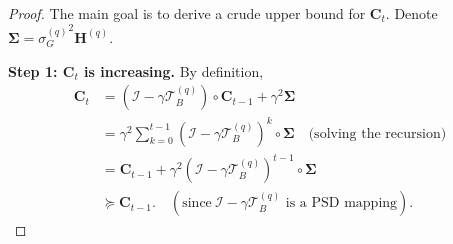 \documentclass[11pt, letterpaper]{article}
\begin{document}
\begin{proof}
    The main goal is to derive a crude upper bound for $\mathbf{C}_t$. Denote $\boldsymbol{\Sigma}={\sigma_G^{(q)}}^2\mathbf{H}^{(q)}$.
    
    \textbf{Step 1: $\mathbf{C}_t$ is increasing.} By definition,
    \begin{equation*}
        \begin{aligned}
            \mathbf{C}_{t} & =(\mathcal{I}-\gamma\mathcal{T}_B^{(q)})\circ\mathbf{C}_{t-1}+\gamma^{2}\boldsymbol{\Sigma} \\
            & =\gamma^2\sum_{k=0}^{t-1}(\mathcal{I}-\gamma\mathcal{T}_B^{(q)})^k\circ\boldsymbol{\Sigma}\quad\text{(solving the recursion)} \\
            & =\mathbf{C}_{t-1}+\gamma^{2}(\mathcal{I}-\gamma\mathcal{T}_B^{(q)})^{t-1}\circ\mathbf{\Sigma} \\
            & \succeq\mathbf{C}_{t-1}.\quad(\mathrm{since~}\mathcal{I}-\gamma\mathcal{T}_B^{(q)}\text{ is a PSD mapping}).
        \end{aligned}
    \end{equation*}


\end{proof}
\end{document}
